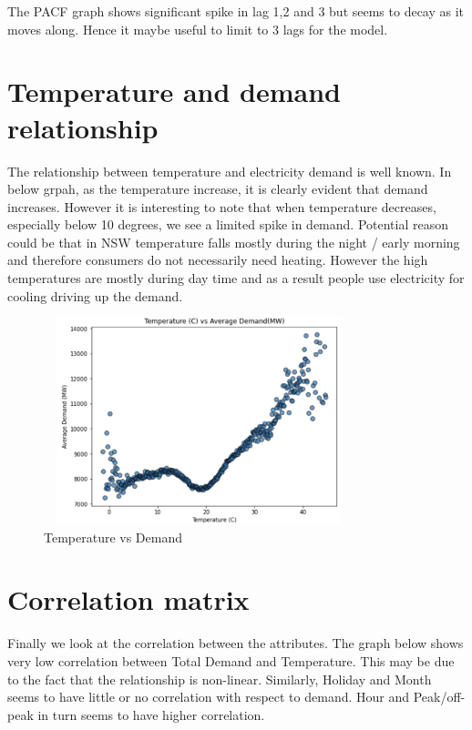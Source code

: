\documentclass[mstat,12pt]{unswthesis}
\begin{document}
The PACF graph shows significant spike in lag 1,2 and 3 but seems to
decay as it moves along. Hence it maybe useful to limit to 3 lags for
the model.

\section{Temperature and demand
relationship}\label{temperature-and-demand-relationship}

The relationship between temperature and electricity demand is well
known. In below grpah, as the temperature increase, it is clearly
evident that demand increases. However it is interesting to note that
when temperature decreases, especially below 10 degrees, we see a
limited spike in demand. Potential reason could be that in NSW
temperature falls mostly during the night / early morning and therefore
consumers do not necessarily need heating. However the high temperatures
are mostly during day time and as a result people use electricity for
cooling driving up the demand.

\begin{figure}[H]
\centering
\includegraphics[width=0.80\textwidth,height=6cm]{temperature_demand.png}
\caption{Temperature vs Demand}
\label{temperature_demand}
\end{figure}

\section{Correlation matrix}\label{correlation-matrix}

Finally we look at the correlation between the attributes. The graph
below shows very low correlation between Total Demand and Temperature.
This may be due to the fact that the relationship is non-linear.
Similarly, Holiday and Month seems to have little or no correlation with
respect to demand. Hour and Peak/off-peak in turn seems to have higher
correlation.
\end{document}
